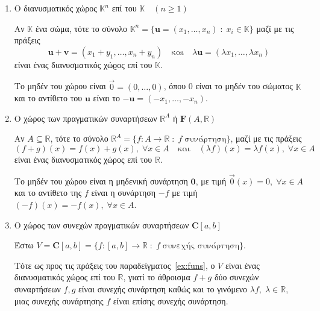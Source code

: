 \begin{examples}
\item {}
    \begin{enumerate}
        \item \label{ex:Rn}\textcolor{Col2}{Ο διανυσματικός χώρος $ \mathbb{K}^{n} $ 
            επί του $ \mathbb{K} \quad (n \geq 1) $}

            Αν $ \mathbb{K} $ ένα σώμα, τότε το σύνολο $ \mathbb{K}^{n} = 
            \{ \mathbf{u} = (x_{1},\ldots,x_{n}) \; : \; x_{i} \in \mathbb{K}\} $ 
            μαζί με τις πράξεις 
            \[
                \mathbf{u}+ \mathbf{v} = (x_{1}+ y_{1}, \ldots , x_{n}+y_{n}) 
                \quad \text{και} \quad \lambda \mathbf{u} = 
                ( \lambda x_{1}, \ldots, \lambda x_{n})
            \]
            είναι ένας διανυσματικός χώϱος επί του $ \mathbb{K} $. 

            Το μηδέν του χώρου 
            είναι $ \vec{0} = (0,\ldots,0) $, όπου 0 είναι το μηδέν του σώματος 
            $ \mathbb{K} $ και το αντίθετο του $ \mathbf{u} $ είναι το $ - \mathbf{u} =
            (- x_{1}, \ldots, - x_{n}) $.

        \item\label{ex:funs} \textcolor{Col2}{Ο χώρος των πραγματικών συναρτήσεων 
            $\mathbb{R} ^{A}$ ή $\mathbf{F}(A, \mathbb{R})$}

            Αν $ A \subseteq \mathbb{R} $, τότε το σύνολο $ \mathbb{R}^{A} = 
            \{ f \colon A \to \mathbb{R} \; : \; f \; \text{συνάρτηση} \} $, μαζί με 
            τις πράξεις
            \[
                (f+g)(x) = f(x) +g(x), \; \forall x \in A \quad \text{και} 
                \quad (\lambda f)(x)= \lambda f(x), \; \forall x \in A
            \] 
            είναι ένας διανυσματικός χώρος επί του $ \mathbb{R} $.

            Το μηδέν του χώρου είναι η μηδενική συνάρτηση $ \mathbf{0} $, με τιμή 
            $ \vec{0}(x)=0, \; \forall x \in A $ και το αντίθετο της $f$ είναι 
            η συνάρτηση $ -f $ με τιμή $ (-f)(x) = - f(x), \; \forall x \in A $.

        \item \textcolor{Col2}{Ο χώρος των συνεχών πραγματικών συναρτήσεων 
            $ \mathbf{C}[a,b] $} 

            Έστω $ V = \mathbf{C}{[a,b]} = \{ f \colon [a,b] \to \mathbb{R} \; 
            : \; f \; \text{συνεχής συνάρτηση} \}  $. 

            Τότε ως προς τις πράξεις του 
            παραδείγματος~\ref{ex:funs}, ο $V$ είναι ένας διανυσματικός χώϱος 
            επί του $ \mathbb{R} $, 
            γιατί το άθροισμα $ f+g $ δύο συνεχών συναρτήσεων $ f,g $ είναι 
            συνεχής συνάρτηση καθώς και το γινόμενο 
            $ \lambda f, \; \lambda \in \mathbb{R} $, μιας συνεχής συνάρτησης 
            $f$ είναι επίσης συνεχής συνάρτηση. 


\end{enumerate}
\end{examples}
